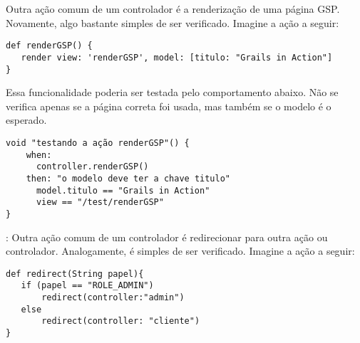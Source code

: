 \vspace{0.3cm}

 Outra  ação comum de  um controlador  é a
renderização  de  uma página  GSP.   Novamente,  algo  bastante simples  de  ser
verificado. Imagine a ação a seguir: 

\vspace{0.2cm}

\begin{mdframed}
\begin{footnotesize}
\begin{verbatim}
def renderGSP() {
   render view: 'renderGSP', model: [titulo: "Grails in Action"]
}
\end{verbatim}
\end{footnotesize}
\end{mdframed}

\vspace{0.2cm}

Essa  funcionalidade  poderia ser  testada  pelo  comportamento  abaixo. Não  se
verifica  apenas se  a página  correta foi  usada, mas  também se  o modelo  é o
esperado. 

\vspace{0.2cm}

\begin{mdframed}
\begin{footnotesize}
\begin{verbatim}
void "testando a ação renderGSP"() {
    when:
      controller.renderGSP()
    then: "o modelo deve ter a chave titulo"
      model.titulo == "Grails in Action"
      view == "/test/renderGSP"
}
\end{verbatim}
\end{footnotesize}
\end{mdframed}

\newpage

: Outra  ação comum de um controlador é
redirecionar  para outra  ação ou  controlador. Analogamente,  é simples  de ser
verificado.  Imagine a ação a seguir:

\vspace{0.2cm}

\begin{mdframed}
\begin{footnotesize}
\begin{verbatim}
def redirect(String papel){
   if (papel == "ROLE_ADMIN")
       redirect(controller:"admin")
   else
       redirect(controller: "cliente")
}
\end{verbatim}
\end{footnotesize}
\end{mdframed}

